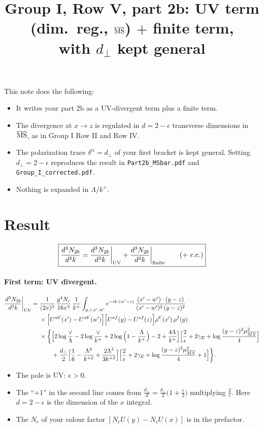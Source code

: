 \documentclass[10pt]{article}
\title{Group I, Row V, part 2b: UV term (dim.\ reg., $\overline{\rm MS}$) $+$ finite term,\\ with $d_\perp$ kept general}
\date{}
\numberwithin{equation}{section}
\begin{document}
\maketitle
\noindent This note does the following:
\begin{itemize}
\item It writes your part 2b as a UV-divergent term plus a finite term.
\item The divergence at $x\to z$ is regulated in $d=2-\epsilon$ transverse dimensions in $\overline{\rm MS}$, as in Group I Row II and Row IV.
\item The polarization trace $\delta^{ii}=d_\perp$ of your first bracket is kept general. Setting $d_\perp=2-\epsilon$ reproduces the result in \texttt{Part2b\_MSbar.pdf} and \texttt{Group\_I\_corrected.pdf}.
\item Nothing is expanded in $\Lambda/k^+$.
\end{itemize}

\section{Result}\label{sec:result}
\begin{equation}
\boxed{\frac{d^{3}N_{2b}}{d^{3}k}=\frac{d^{3}N_{2b}}{d^{3}k}\bigg|_{\rm UV}+\frac{d^{3}N_{2b}}{d^{3}k}\bigg|_{\rm finite}\qquad(+\ {\rm c.c.})}
\end{equation}

\paragraph{First term: UV divergent.}
\begin{align}
\frac{d^{3}N_{2b}}{d^{3}k}\bigg|_{\rm UV}={}&\frac{1}{(2\pi)^{3}}\,\frac{g^{4}N_{c}}{16\pi^{4}}\,\frac{1}{k^{+}}\int_{y,z,x',w'}e^{-ik\cdot(w'-z)}\,\frac{(x'-w')\cdot(y-z)}{(x'-w')^{2}\,(y-z)^{2}}\notag\\
&\times\Big[U^{ab'}(x')-U^{ab'}(w')\Big]\Big[U^{af}(y)-U^{af}(z)\Big]\rho^{b'}(x')\,\rho^{f}(y)\notag\\
&\times\bigg\{\Big[2\log\frac{\vee}{\Lambda}-2\log\frac{\vee}{k^{+}}+2\log\Big(1-\frac{\Lambda}{k^{+}}\Big)-2+\frac{4\Lambda}{k^{+}}\Big]\Big[\frac{2}{\epsilon}+2\gamma_{E}+\log\frac{(y-z)^{2}\mu^{2}_{\overline{MS}}}{4}\Big]\notag\\
&\qquad+\frac{d_\perp}{2}\Big[\frac16-\frac{\Lambda^{2}}{k^{+2}}+\frac{2\Lambda^{3}}{3k^{+3}}\Big]\Big[\frac{2}{\epsilon}+2\gamma_{E}+\log\frac{(y-z)^{2}\mu^{2}_{\overline{MS}}}{4}+1\Big]\bigg\}.
\label{eq:UV}
\end{align}
\begin{itemize}
\item The pole is UV: $\epsilon>0$.
\item The ``$+1$'' in the second line comes from $\frac{d_\perp}{d}=\frac{d_\perp}{2}\big(1+\frac\epsilon2\big)$ multiplying $\frac2\epsilon$. Here $d=2-\epsilon$ is the dimension of the $x$ integral.
\item The $N_c$ of your colour factor $[N_cU(y)-N_cU(x)]$ is in the prefactor.
\end{itemize}
\end{document}
